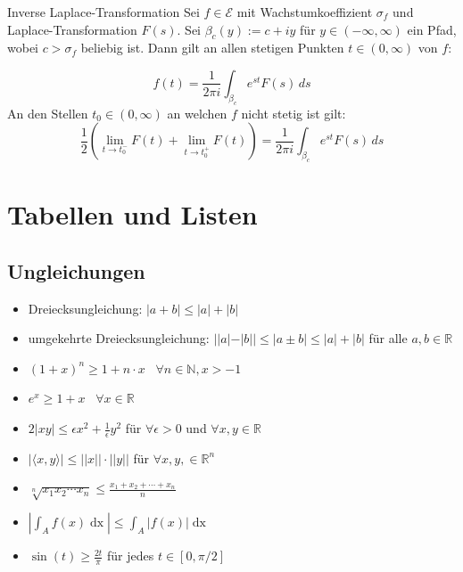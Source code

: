 \documentclass[a4paper,10pt]{article}
\def\R{\mathbb{R}}
\begin{document}
\begin{mainbox}{Inverse Laplace-Transformation}
  Sei \(f\in\mathcal{E}\) mit Wachstumkoeffizient \(\sigma_f\) und Laplace-Transformation \(F(s)\). Sei \(\beta_c( y):=c+ i y\) für \(y\in(-\infty,\infty)\) ein Pfad, wobei \(c>\sigma_f\) beliebig ist. Dann gilt an allen stetigen Punkten \(t\in(0,\infty)\) von \(f\):
  
  \begin{equation*} f(t) =\frac{1}{2\pi i}\int_{\beta_c} e^{st}F(s)\,ds \end{equation*} An den Stellen \(t_0\in(0,\infty)\) an welchen $f$ nicht stetig ist gilt: \begin{equation*} \frac12\left(\lim_{t\to t_0^-}F(t)+\lim_{t\to t_0^+}F(t)\right) =\frac{1}{2\pi i}\int_{\beta_c} e^{st}F(s)\,ds \end{equation*}

\end{mainbox}

\section{Tabellen und Listen}

\subsection{Ungleichungen}

\begin{itemize}
  \item Dreiecksungleichung: $|a + b| \leq |a| + |b|$
  \item umgekehrte Dreiecksungleichung: $||a| - |b|| \leq |a \pm b| \leq |a| + |b|$ für alle $a,b \in \R$
  \item $(1+x)^n \geq 1+ n\cdot x$ \, $\forall n\in \mathbb{N}, x > -1$
  \item $e^x \geq 1 + x$ \, $\forall x\in \mathbb{R}$
  \item $2|xy| \leq \epsilon x^2 + \frac{1}{\epsilon} y^2$ für $\forall \epsilon > 0$ und $\forall x,y \in \mathbb{R}$
  \item $|\langle x,y \rangle| \leq ||x|| \cdot ||y||$ für $\forall x,y, \in \mathbb{R}^n$
  \item $\sqrt[n]{x_1 x_2 \cdots x_n} \leq \frac{x_1 + x_2 + \cdots + x_n}{n}$
  \item $\left| \int_A f(x) \mathop{dx}\right| \le \int_A \left|f(x)\right| \mathop{dx}$
  \item $\sin(t) \geq \frac{2t}{\pi}$ für jedes $t \in [0, \pi/2]$
\end{itemize}
\end{document}
